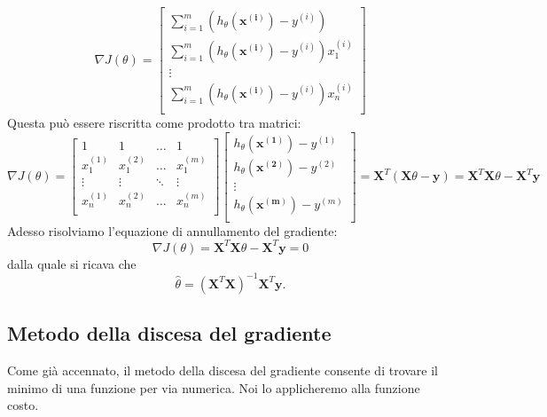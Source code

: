 \begin{equation*}
\nabla J(\theta) = \begin{bmatrix}
\sum_{i=1}^m (h_\theta(\mathbf{x^{(i)}})-y^{(i)}) \\
\sum_{i=1}^m (h_\theta(\mathbf{x^{(i)}})-y^{(i)})x_1^{(i)} \\
\vdots \\
\sum_{i=1}^m (h_\theta(\mathbf{x^{(i)}})-y^{(i)})x_n^{(i)} \\
 \end{bmatrix}
\end{equation*}
Questa può essere riscritta come prodotto tra matrici:
\begin{dmath*}
\nabla J(\theta) = \begin{bmatrix}
1 & 1 & \dots  & 1 \\
 x_1^{(1)}  & x_1^{(2)} & \dots  & x_1^{(m)} \\

  \vdots & \vdots & \ddots & \vdots \\
   x_n^{(1)}  & x_n^{(2)} & \dots &  x_n^{(m)} \\
\end{bmatrix}
\begin{bmatrix}
 h_\theta(\mathbf{x^{(1)}}) - y^{(1)} \\
h_\theta(\mathbf{x^{(2)}}) - y^{(2)} \\
  \vdots \\
   h_\theta(\mathbf{x^{(m)}}) - y^{(m)} \\
\end{bmatrix}
= \mathbf{X}^T (\mathbf{X} \theta - \mathbf{y})
= \mathbf{X}^T \mathbf{X} \theta - \mathbf{X}^T  \mathbf{y}
\end{dmath*}
Adesso risolviamo l'equazione di annullamento del gradiente:
\begin{equation*}
\nabla J(\theta) = \mathbf{X}^T \mathbf{X} \theta - \mathbf{X}^T  \mathbf{y} = 0
\end{equation*}
dalla quale si ricava che
\begin{equation*}
\hat \theta = (\mathbf{X}^T\mathbf{X})^{-1} \mathbf{X}^T \mathbf{y}.
\end{equation*}

\subsection{Metodo della discesa del gradiente}\label{sec:gradiente}
Come già accennato, il metodo della discesa del gradiente consente di trovare il minimo di una funzione per via numerica. Noi lo applicheremo alla funzione costo.


